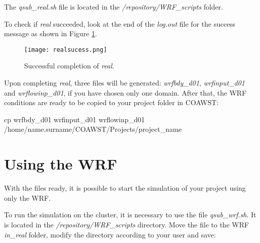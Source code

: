 \begin{tcolorbox}[enhanced,
  grow to left by=0cm,%
  grow to right by=0cm,%
  enlarge top by=0cm,%
  enlarge bottom by=0cm,%
  tcbox raise base,
  boxrule=1.0pt,
  left=18mm,
  colframe=red!50!black,coltext=red!25!black,colback=red!10!white,
  overlay={\begin{tcbclipinterior}\fill[red!75!blue!50!white] (frame.south west)
    rectangle node[text=white,font=\sffamily\bfseries\footnotesize,rotate=0] {WARNING} ([xshift=18mm]frame.north west);\end{tcbclipinterior}}]
The \textit{qsub\_real.sh} file is located in the \textit{/repository/WRF\_scripts} folder.
\end{tcolorbox}
\bigskip

\noindent To check if \textit{real} succeeded, look at the end of the \textit{log.out} file for the success message as shown 
in Figure \textcolor{bleu_cite}{\ref{realfinish}}.
\bigskip

\begin{figure}[H]
    \centering
    \texttt{[image: realsucess.png]}
    \caption{Successful completion of \textit{real}.}
    \label{realfinish}
\end{figure}
\bigskip


\noindent Upon completing \textit{real}, three files will be generated: \textit{wrfbdy\_d01}, \textit{wrfinput\_d01} and 
\textit{wrflowinp\_d01}, if you have chosen only one domain. After that, the WRF conditions are ready to be copied to your project
folder in COAWST:
\bigskip

\begin{bashcode}[fontsize=\scriptsize]
cp wrfbdy_d01 wrfinput_d01 wrflowinp_d01 /home/name.surname/COAWST/Projects/project_name
\end{bashcode}
\bigskip

\section{Using the WRF}\label{wrfsecao2}
\bigskip

\noindent With the files ready, it is possible to start the simulation of your project using only the WRF.
\bigskip

\noindent To run the simulation on the cluster, it is necessary to use the file \textit{qsub\_wrf.sh}. It is located in the 
\textit{/repository/WRF\_scripts} directory. Move the file to the WRF \textit{in\_real} folder, modify the directory according
to your user and save:
\bigskip

